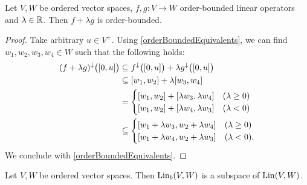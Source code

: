 \begin{proposition}
Let $V,W$ be ordered vector spaces, $f,g: V\to W$ order-bounded linear operators and $\lambda \in \mathbb{R}$. Then $f + \lambda g$ is order-bounded.
\end{proposition}
\begin{proof}
Take arbitrary $u\in V^+$. Using \ref{orderBoundedEquivalents}, we can find $w_1,w_2,w_3,w_4\in W$ such that the following holds:
\begin{align*}
(f + \lambda g)^{\imf}\big(\interval{0,u}\big) &\subseteq f^{\imf}\big(\interval{0,u}\big) + \lambda g^{\imf}\big(\interval{0,u}\big) \\
&\subseteq \interval{w_1,w_2} + \lambda\interval{w_3, w_4} \\
&= \begin{cases}
\interval{w_1,w_2} + \interval{\lambda w_3, \lambda w_4} & (\lambda \geq 0) \\
\interval{w_1,w_2} + \interval{\lambda w_4, \lambda w_3} & (\lambda < 0)
\end{cases} \\
&\subseteq \begin{cases}
\interval{w_1+\lambda w_3, w_2 + \lambda w_4} & (\lambda \geq 0) \\
\interval{w_1+ \lambda w_4, w_2 + \lambda w_3} & (\lambda < 0).
\end{cases}
\end{align*}
We conclude with
\ref{orderBoundedEquivalents}.
\end{proof}
\begin{corollary}
Let $V,W$ be ordered vector spaces. Then $\operatorname{Lin}_b(V,W)$ is a subspace of $\operatorname{Lin}(V,W)$.
\end{corollary}


